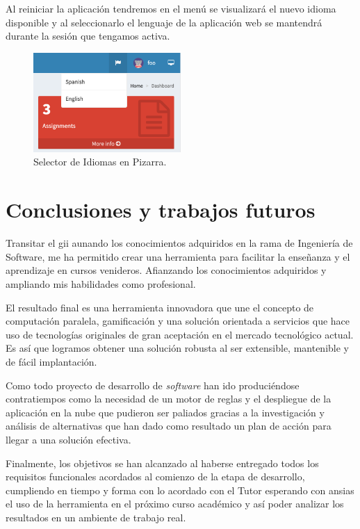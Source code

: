 \documentclass[11pt,spanish,listoffigures,listoftables]{tfgetsinf}
\begin{document}
Al reiniciar la aplicación tendremos en el menú se visualizará el nuevo idioma disponible y al seleccionarlo el lenguaje de la aplicación web se mantendrá durante la sesión que tengamos activa.

\begin{figure}[!ht]
	\centering
	\includegraphics[width=0.50\textwidth]{img/pizarra-new-language}
	\caption[Selector de Idiomas en Pizarra]{Selector de Idiomas en Pizarra.}
	\label{figura:pizarra-new-language}
\end{figure}

\chapter{Conclusiones y trabajos futuros}

Transitar el \acrlong{gii} aunando los conocimientos adquiridos en la rama de Ingeniería de Software, me ha permitido crear una herramienta para facilitar la enseñanza y el aprendizaje en cursos venideros. Afianzando los conocimientos adquiridos y ampliando mis habilidades como profesional.

El resultado final es una herramienta innovadora que une el concepto de computación paralela, gamificación y una solución orientada a servicios que hace uso de tecnologías originales de gran aceptación en el mercado tecnológico actual. Es así que logramos obtener una solución robusta al ser extensible, mantenible y de fácil implantación.

Como todo proyecto de desarrollo de \textit{software} han ido produciéndose contratiempos como la necesidad de un motor de reglas y el despliegue de la aplicación en la nube que pudieron ser paliados gracias a la investigación y análisis de alternativas que han dado como resultado un plan de acción para llegar a una solución efectiva.

Finalmente, los objetivos se han alcanzado al haberse entregado todos los requisitos funcionales acordados al comienzo de la etapa de desarrollo, cumpliendo en tiempo y forma con lo acordado con el Tutor esperando con ansias el uso de la herramienta en el próximo curso académico y así poder analizar los resultados en un ambiente de trabajo real.
\end{document}
